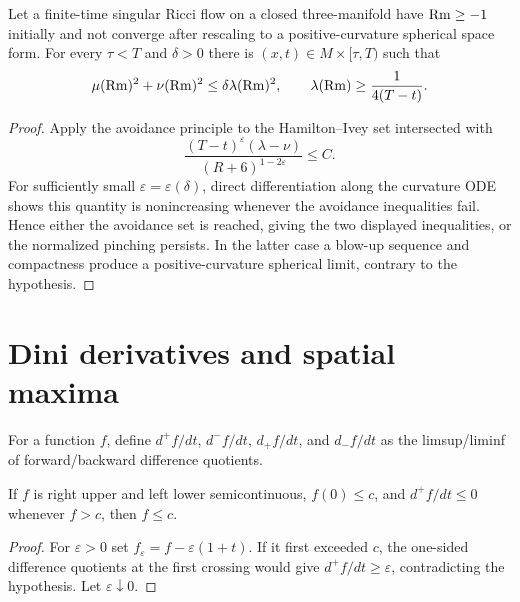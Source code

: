 \begin{theorem}
\label{thm:chow-ii-necklike-points}
Let a finite-time singular Ricci flow on a closed three-manifold have
$\operatorname{Rm}\ge-1$ initially and not converge after rescaling to a positive-curvature
spherical space form.  For every $\tau<T$ and $\delta>0$ there is
$(x,t)\in M\times[\tau,T)$ such that
\[
\mu(\operatorname{Rm})^2+\nu(\operatorname{Rm})^2\le\delta\lambda(\operatorname{Rm})^2,
\qquad
\lambda(\operatorname{Rm})\ge\frac1{4(T-t)}.
\]
\end{theorem}
\begin{proof}
Apply the avoidance principle to the Hamilton--Ivey set intersected with
\[
\frac{(T-t)^\varepsilon(\lambda-\nu)}{(R+6)^{1-2\varepsilon}}\le C.
\]
For sufficiently small $\varepsilon=\varepsilon(\delta)$, direct differentiation
along the curvature ODE shows this quantity is nonincreasing whenever the
avoidance inequalities fail.  Hence either the avoidance set is reached, giving
the two displayed inequalities, or the normalized pinching persists.  In the
latter case a blow-up sequence and compactness produce a positive-curvature
spherical limit, contrary to the hypothesis.
\end{proof}

\section{Dini derivatives and spatial maxima}

\begin{definition}
\label{def:chow-ii-dini-derivatives}
For a function $f$, define $d^+f/dt$, $d^-f/dt$, $d_+f/dt$, and $d_-f/dt$ as
the limsup/liminf of forward/backward difference quotients.
\end{definition}

\begin{lemma}
\label{lem:chow-ii-dini-upper-bound}
If $f$ is right upper and left lower semicontinuous, $f(0)\le c$, and
$d^+f/dt\le0$ whenever $f>c$, then $f\le c$.
\end{lemma}
\begin{proof}
For $\varepsilon>0$ set $f_\varepsilon=f-\varepsilon(1+t)$.  If it first exceeded
$c$, the one-sided difference quotients at the first crossing would give
$d^+f/dt\ge\varepsilon$, contradicting the hypothesis.  Let $\varepsilon\downarrow0$.
\end{proof}


